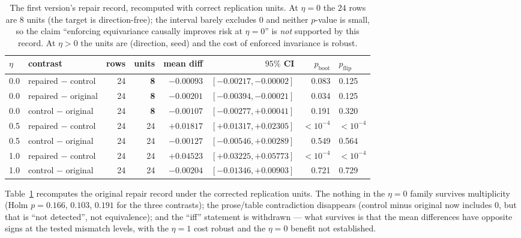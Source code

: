 \documentclass{neurips_2024}
\begin{document}
\begin{table}[t]
\centering
\caption{The first version's repair record, recomputed with correct replication units.
At $\eta{=}0$ the $24$ rows are $8$ units (the target is direction-free); the interval
barely excludes $0$ and neither $p$-value is small, so the claim ``enforcing equivariance
causally improves risk at $\eta{=}0$'' is \emph{not} supported by this record. At
$\eta{>}0$ the units are (direction, seed) and the cost of enforced invariance is robust.}
\label{tab:v1}
\small
\begin{tabular}{@{}llrrrrrl@{}}
\toprule
$\eta$ & contrast & rows & units & mean diff & $95\%$ CI & $p_{\text{boot}}$ & $p_{\text{flip}}$ \\
\midrule
0.0 & repaired $-$ control & 24 & \textbf{8} & $-0.00093$ & $[-0.00217,-0.00002]$ & 0.083 & 0.125 \\
0.0 & repaired $-$ original & 24 & \textbf{8} & $-0.00201$ & $[-0.00394,-0.00021]$ & 0.034 & 0.125 \\
0.0 & control $-$ original & 24 & \textbf{8} & $-0.00107$ & $[-0.00277,+0.00041]$ & 0.191 & 0.320 \\
\midrule
0.5 & repaired $-$ control & 24 & 24 & $+0.01817$ & $[+0.01317,+0.02305]$ & $<10^{-4}$ & $<10^{-4}$ \\
0.5 & control $-$ original & 24 & 24 & $-0.00127$ & $[-0.00546,+0.00289]$ & 0.549 & 0.564 \\
\midrule
1.0 & repaired $-$ control & 24 & 24 & $\mathbf{+0.04523}$ & $[+0.03225,+0.05773]$ & $<10^{-4}$ & $<10^{-4}$ \\
1.0 & control $-$ original & 24 & 24 & $-0.00204$ & $[-0.01346,+0.00903]$ & 0.721 & 0.729 \\
\bottomrule
\end{tabular}
\end{table}

Table~\ref{tab:v1} recomputes the original repair record under the corrected replication
units. The
nothing in the $\eta{=}0$ family survives multiplicity (Holm $p{=}0.166$, $0.103$,
$0.191$ for the three contrasts); the
prose/table contradiction disappears (control minus original now includes $0$, but that is
``not detected'', not equivalence); and the ``iff'' statement is withdrawn --- what
survives is that the mean differences have opposite signs at the tested mismatch levels,
with the $\eta{=}1$ cost robust and the $\eta{=}0$ benefit not established.
\end{document}
